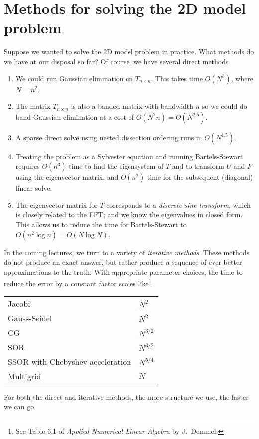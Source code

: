 \section{Methods for solving the 2D model problem}

Suppose we wanted to solve the 2D model problem in practice.  What
methods do we have at our disposal so far?  Of course, we have several
direct methods
\begin{enumerate}
\item
  We could run Gaussian elimination on $T_{n \times n}$.  This takes
  time $O(N^3)$, where $N = n^2$.
\item
  The matrix $T_{n \times n}$ is also a banded matrix with bandwidth
  $n$ so we could do band Gaussian elimination at a cost of
  $O(N^2 n) = O(N^{2.5})$.
\item
  A sparse direct solve using nested dissection ordering runs in
  $O(N^{1.5})$.
\item
  Treating the problem as a Sylvester equation and running
  Bartels-Stewart requires $O(n^3)$ time to find the eigensystem of
  $T$ and to transform $U$ and $F$ using the eigenvector matrix;
  and $O(n^2)$ time for the subsequent (diagonal) linear solve.
\item
  The eigenvector matrix for $T$ corresponds to a {\em discrete sine
    transform}, which is closely related to the FFT; and we know the
  eigenvalues in closed form.  This allows us to reduce the time for
  Bartels-Stewart to $O(n^2 \log n) = O(N \log N)$.
\end{enumerate}

In the coming lectures, we turn to a variety of {\em iterative methods}.
These methods do not produce an exact answer, but rather produce a
sequence of ever-better approximations to the truth.
With appropriate parameter choices,
the time to reduce the error by a constant factor scales
like\footnote{%
See Table 6.1 of {\em Applied Numerical Linear Algebra} by J.~Demmel.}
\begin{center}
\begin{tabular}{ll}
  Jacobi & $N^2$ \\
  Gauss-Seidel & $N^2$ \\
  CG & $N^{3/2}$ \\
  SOR & $N^{3/2}$ \\
  SSOR with Chebyshev acceleration & $N^{5/4}$ \\
  Multigrid & $N$
\end{tabular}
\end{center}
For both the direct and iterative methods, the more structure we use,
the faster we can go.
